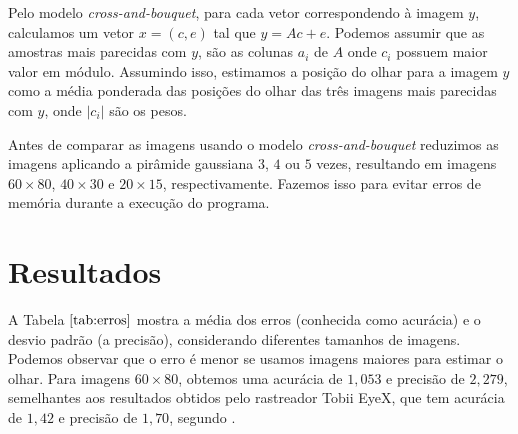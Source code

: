Pelo modelo \textit{cross-and-bouquet}, para cada vetor correspondendo à imagem $y$, calculamos um vetor $x = (c, e)$ tal que $y = Ac + e$. Podemos assumir que as amostras mais parecidas com $y$, são as colunas $a_i$ de $A$ onde $c_i$ possuem maior valor em módulo. Assumindo isso, estimamos a posição do olhar para a imagem $y$ como a média ponderada das posições do olhar das três imagens mais parecidas com $y$, onde $\vert c_i \vert$ são os pesos.

Antes de comparar as imagens usando o modelo \textit{cross-and-bouquet} reduzimos as imagens aplicando a pirâmide gaussiana $3$, $4$ ou $5$ vezes, resultando em imagens $60 \times 80$, $40 \times 30$ e $20 \times 15$, respectivamente. Fazemos isso para evitar erros de memória durante a execução do programa.


\section{Resultados}
A Tabela $\ref{tab:erros}$ mostra a média dos erros (conhecida como acurácia) e o desvio padrão (a precisão), considerando  diferentes tamanhos de imagens. Podemos observar que o erro é menor se usamos imagens maiores para estimar o olhar. Para imagens $60 \times 80$, obtemos uma acurácia de $1,053 $ e precisão de $2,279$, semelhantes aos resultados obtidos pelo rastreador Tobii EyeX, que tem acurácia de $1,42$ e precisão de $1,70$, segundo \cite{liboku}.

